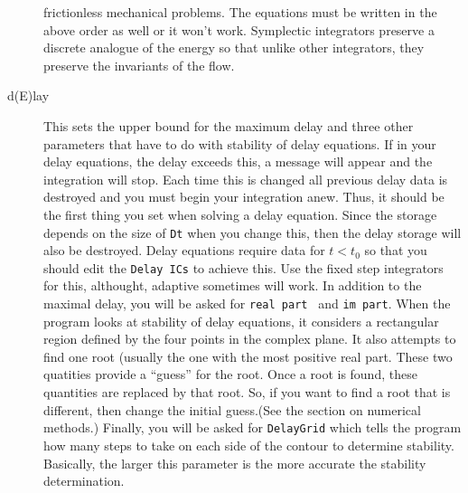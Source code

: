 \documentclass{article}
\begin{document}
\begin{description}
frictionless mechanical problems. The equations must be written in the
above order as well or it won't work.  Symplectic integrators preserve
a discrete analogue of the energy so that unlike other integrators,
they preserve the invariants of the flow.
\item[d(E)lay]  This sets the upper bound for the maximum delay and
three other parameters that have to do with stability of delay
equations.
 If in your delay
 equations, the delay exceeds this, a message will appear and the integration
will stop.  Each time this is changed all previous delay data is destroyed and
 you must begin your integration anew.  Thus, it should be the first thing you
 set when solving a delay equation.  Since the storage depends on the size of
 {\tt Dt} when you change this, then the delay storage will also be
destroyed.  Delay equations require data for $t<t_0$ so that you
should edit the {\tt Delay ICs} to achieve this.  Use the fixed step
integrators for this, althought, adaptive sometimes will work.
  In addition to the maximal delay,
you will be asked for {\tt real part } and {\tt im part}.  When the
program looks at stability of delay equations, it considers a
rectangular region defined by the four points in the complex plane.
It also attempts to find one root (usually the one with the most positive
real part. These two quatities provide a ``guess'' for the root.
Once a root is found, these quantities are replaced by that root. So,
if you want to find a root that is different, then change the initial
guess.(See the section
on numerical methods.) Finally, you will be asked for {\tt DelayGrid}
which tells the program how many steps to take on each side of the
contour to determine stability.  Basically, the larger this
parameter is the more accurate the stability determination.


\end{description}
\end{document}
